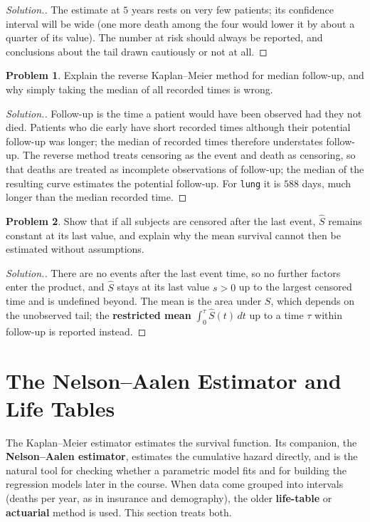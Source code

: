 \documentclass[11pt,a4paper]{article}
\numberwithin{equation}{section}
\theoremstyle{definition}
\newtheorem{problemx}{Problem}[subsection]
\newenvironment{problem}{\begin{problemx}}{\end{problemx}}
\newenvironment{solution}
  {\renewcommand{\qedsymbol}{}\begin{proof}[\textit{Solution}.]}
  {\end{proof}}
\begin{document}
\begin{solution}
The estimate at $5$ years rests on very few patients; its confidence interval will be wide (one more death among the four would lower it by about a quarter of its value). The number at risk should always be reported, and conclusions about the tail drawn cautiously or not at all.
\end{solution}

\begin{problem}
Explain the reverse Kaplan--Meier method for median follow-up, and why simply taking the median of all recorded times is wrong.
\end{problem}

\begin{solution}
Follow-up is the time a patient would have been observed had they not died. Patients who die early have short recorded times although their potential follow-up was longer; the median of recorded times therefore understates follow-up. The reverse method treats censoring as the event and death as censoring, so that deaths are treated as incomplete observations of follow-up; the
median of the resulting curve estimates the potential follow-up. For \texttt{lung} it is $588$ days, much longer than the median recorded time.
\end{solution}

\begin{problem}
Show that if all subjects are censored after the last event, $\hat S$ remains constant at its last value, and explain why the mean survival cannot then be estimated without assumptions.
\end{problem}

\begin{solution}
There are no events after the last event time, so no further factors enter the product, and $\hat S$ stays at its last value $s > 0$ up to the largest censored time and is undefined beyond. The mean is the area under $S$, which depends on the unobserved tail; the \textbf{restricted mean} $\int_0^\tau\hat S(t)\,dt$ up to a time $\tau$ within follow-up is reported instead.
\end{solution}

\section{The Nelson--Aalen Estimator and Life Tables}
\label{sec:nelson}

The Kaplan--Meier estimator estimates the survival function. Its companion, the \textbf{Nelson--Aalen estimator}, estimates the cumulative hazard directly, and is the natural tool for checking whether a parametric model fits and for building the regression models later in the course. When data come grouped into intervals (deaths per year, as in
insurance and demography), the older \textbf{life-table} or \textbf{actuarial} method is used. This section treats both.
\end{document}
